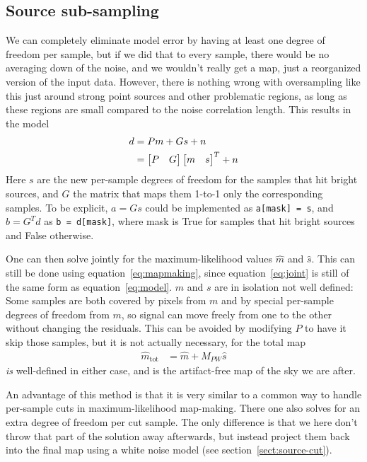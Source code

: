 \documentclass{article}
\newcommand{\code}[1]{\texttt{#1}}
\begin{document}
\subsection{Source sub-sampling}
We can completely eliminate model error by having at least one degree of freedom per sample,
but if we did that to every sample, there would be no averaging down of the noise,
and we wouldn't really get a map, just a reorganized version of the input data. However,
there is nothing wrong with oversampling like this just around strong point sources and
other problematic regions, as long as these regions are small compared to the noise
correlation length. This results in the model
\begin{align}
d &= Pm + Gs + n \notag \\
	&= \begin{bmatrix}P&G\end{bmatrix}\begin{bmatrix}m&s\end{bmatrix}^T + n \label{eq:joint}
\end{align}
Here $s$ are the new per-sample degrees of freedom for the samples that hit bright sources,
and $G$ the matrix that maps them 1-to-1 only the corresponding samples. To be explicit,
$a=Gs$ could be implemented as \code{a[mask] = s}, and $b=G^Td$ as \code{b = d[mask]},
where mask is True for samples that hit bright sources and False otherwise.

One can then solve jointly for the maximum-likelihood values $\hat m$ and $\hat s$. This can still
be done using equation~\ref{eq:mapmaking}, since equation~\ref{eq:joint} is still of the same form
as equation~\ref{eq:model}. $m$ and $s$ are in isolation not well defined: Some samples are
both covered by pixels from $m$ and by special per-sample degrees of freedom from $m$, so
signal can move freely from one to the other without changing the residuals. This can be avoided by
modifying $P$ to have it skip those samples, but it is not actually necessary, for
the total map
\begin{align}
\hat m_\textrm{tot}&= \hat m + M_{PW}\hat s \label{eq:jointsol}
\end{align}
\emph{is} well-defined in either case, and is the artifact-free map of the sky we are after.

An advantage of this method is that it is very similar to a common way to handle
per-sample cuts in maximum-likelihood map-making. There one also solves for an extra degree
of freedom per cut sample. The only difference is that we here don't throw that part of the
solution away afterwards, but instead project them back into the final map using a white noise model
(see section~\ref{sect:source-cut}).
\end{document}
